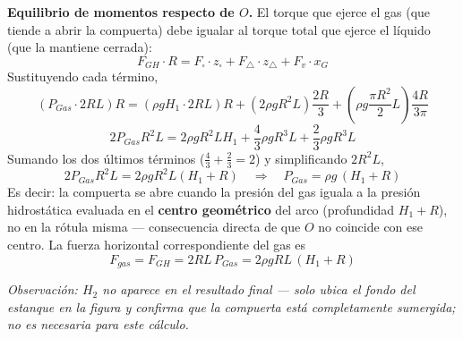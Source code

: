 \documentclass[11pt]{article}
\begin{document}
\textbf{Equilibrio de momentos respecto de $O$.} El torque que ejerce el gas (que
tiende a abrir la compuerta) debe igualar al torque total que ejerce el l\'iquido (que
la mantiene cerrada):
\begin{equation}
F_{GH}\cdot R=F_\square\cdot z_\square+F_\triangle\cdot z_\triangle+F_v\cdot x_G
\end{equation}
Sustituyendo cada t\'ermino,
\begin{equation}
\left(P_{Gas}\cdot2RL\right)R
=\left(\rho gH_1\cdot2RL\right)R+\left(2\rho gR^2L\right)\frac{2R}{3}
+\left(\rho g\frac{\pi R^2}{2}L\right)\frac{4R}{3\pi}
\end{equation}
\begin{equation}
2P_{Gas}R^2L=2\rho gR^2LH_1+\frac{4}{3}\rho gR^3L+\frac{2}{3}\rho gR^3L
\end{equation}
Sumando los dos \'ultimos t\'erminos ($\frac43+\frac23=2$) y simplificando $2R^2L$,
\begin{equation}
2P_{Gas}R^2L=2\rho gR^2L(H_1+R)
\quad\Longrightarrow\quad
\boxed{P_{Gas}=\rho g\,(H_1+R)}
\end{equation}
Es decir: la compuerta se abre cuando la presi\'on del gas iguala a la presi\'on
hidrost\'atica evaluada en el \textbf{centro geom\'etrico} del arco (profundidad
$H_1+R$), no en la r\'otula misma --- consecuencia directa de que $O$ no coincide con
ese centro. La fuerza horizontal correspondiente del gas es
\begin{equation}
\boxed{F_{gas}=F_{GH}=2RL\,P_{Gas}=2\rho gRL\,(H_1+R)}
\end{equation}

\noindent\textit{Observaci\'on: $H_2$ no aparece en el resultado final --- solo ubica el
fondo del estanque en la figura y confirma que la compuerta est\'a completamente
sumergida; no es necesaria para este c\'alculo.}
\end{document}
